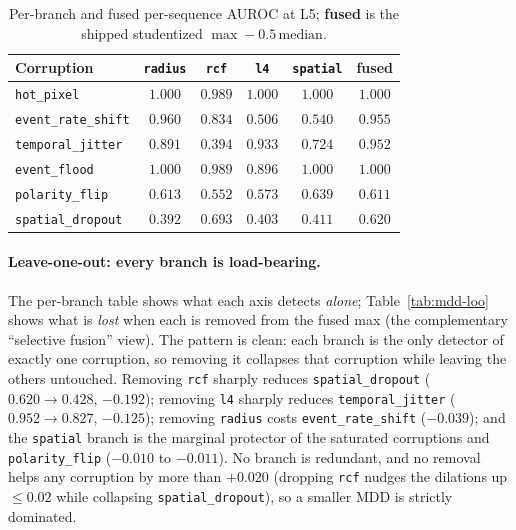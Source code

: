 ﻿\documentclass{article} %
\theoremstyle{remark}
\begin{document}
\begin{table}[t]
  \centering\small
  \caption{Per-branch and fused per-sequence AUROC at L5; \textbf{fused} is the shipped studentized
  $\max-0.5\,\mathrm{median}$.}
  \label{tab:mdd-branch}
  \begin{tabular}{lccccc}
    \toprule
    Corruption & \texttt{radius} & \texttt{rcf} & \texttt{l4} & \texttt{spatial} & \textbf{fused} \\
    \midrule
    \texttt{hot\_pixel}        & $1.000$ & $0.989$ & $1.000$ & $1.000$ & $\mathbf{1.000}$ \\
    \texttt{event\_rate\_shift}& $0.960$ & $0.834$ & $0.506$ & $0.540$ & $\mathbf{0.955}$ \\
    \texttt{temporal\_jitter}  & $0.891$ & $0.394$ & $0.933$ & $0.724$ & $\mathbf{0.952}$ \\
    \texttt{event\_flood}      & $1.000$ & $0.989$ & $0.896$ & $1.000$ & $\mathbf{1.000}$ \\
    \texttt{polarity\_flip}    & $0.613$ & $0.552$ & $0.573$ & $0.639$ & $\mathbf{0.611}$ \\
    \texttt{spatial\_dropout}  & $0.392$ & $0.693$ & $0.403$ & $0.411$ & $\mathbf{0.620}$ \\
    \bottomrule
  \end{tabular}
\end{table}

\paragraph{Leave-one-out: every branch is load-bearing.}
The per-branch table shows what each axis detects \emph{alone}; Table~\ref{tab:mdd-loo}
shows what is \emph{lost} when each is removed from the fused max (the complementary
``selective fusion'' view). The pattern is clean: each branch is the only detector of
exactly one corruption, so removing it collapses that corruption while leaving the others
untouched. Removing \texttt{rcf} sharply reduces \texttt{spatial\_dropout} ($0.620\!\to\!0.428$,
$-0.192$); removing \texttt{l4} sharply reduces \texttt{temporal\_jitter} ($0.952\!\to\!0.827$,
$-0.125$); removing \texttt{radius} costs \texttt{event\_rate\_shift} ($-0.039$); and the
\texttt{spatial} branch is the marginal protector of the saturated corruptions and
\texttt{polarity\_flip} ($-0.010$ to $-0.011$). No branch is redundant, and no removal
helps any corruption by more than $+0.020$ (dropping \texttt{rcf} nudges the dilations up
$\le0.02$ while collapsing \texttt{spatial\_dropout}), so a smaller MDD is strictly dominated.
\end{document}
